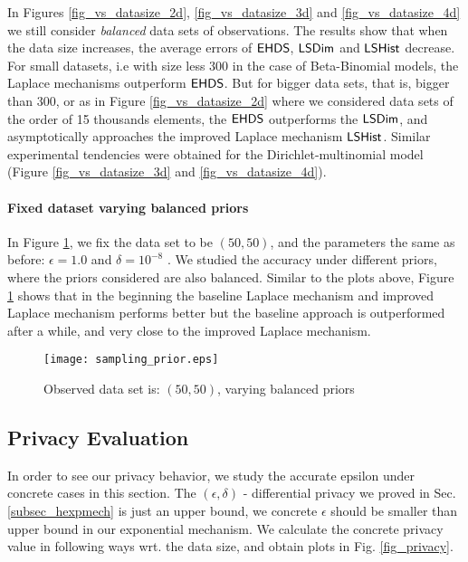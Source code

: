 \documentclass{article}
\begin{document}
In Figures \ref{fig_vs_datasize_2d}, \ref{fig_vs_datasize_3d} and \ref{fig_vs_datasize_4d} we still consider \emph{balanced} data sets
of observations. The results show that when the data size increases, the average errors of
$\mathsf{EHDS}$, $\mathsf{LSDim}$ and $\mathsf{LSHist}$ decrease. For small datasets,
i.e with size less $300$ in the case of Beta-Binomial models, the Laplace mechanisms outperform $\mathsf{EHDS}$.
But for bigger data sets, that is, bigger than $300$, or as in Figure \ref{fig_vs_datasize_2d} where
we considered data sets of the order of 15 thousands elements,
the $\mathsf{EHDS}$ outperforms the $\mathsf{LSDim}$, and asymptotically approaches the improved Laplace mechanism $\mathsf{LSHist}$.
Similar experimental tendencies were obtained for the Dirichlet-multinomial model (Figure \ref{fig_vs_datasize_3d} and \ref{fig_vs_datasize_4d}).


\paragraph{Fixed dataset varying balanced priors}
\label{subsubsec_vs_prior}
In Figure \ref{fig_vs_prior}, we fix the data set to be $(50,50)$, and the parameters the same as before: $\epsilon = 1.0$ and $\delta = 10^{-8}$ . We studied the accuracy under different priors, where the priors considered  are also balanced.
Similar to the plots above, Figure \ref{fig_vs_prior} shows that in the beginning the baseline Laplace mechanism and improved Laplace mechanism performs better but the baseline approach is outperformed after a while, and very close to the improved Laplace mechanism.
\begin{figure}
\centering
\texttt{[image: sampling\_prior.eps]}
\caption{Observed data set is: $(50,50)$, varying balanced priors}
\label{fig_vs_prior}
\end{figure}

\subsection{Privacy Evaluation}
\label{subsec_experiment_privacy}
In order to see our privacy behavior, we study the accurate epsilon under concrete cases in this section. The $(\epsilon, \delta)$ - differential privacy we proved in Sec. \ref{subsec_hexpmech} is just an upper bound, we concrete $\epsilon$ should be smaller than upper bound in our exponential mechanism. We calculate the concrete privacy value in following ways wrt. the data size, and obtain plots in Fig. \ref{fig_privacy}.
\end{document}
